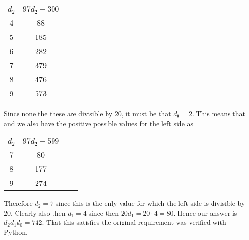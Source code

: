 \documentclass[table]{article}
\begin{document}
{\begin{center}
\begin{tabular}{c|ccc}
      $d_2$ & $97 d_2 - 300$ \\
      \hline
      4 & 88 \\
      5 & 185 \\
      6 & 282 \\
      7 & 379 \\
      8 & 476 \\
      9 & 573 \\
    \end{tabular}
  \end{center}
  Since none the these are divisible by $20$, it must be that $d_0 = 2$.
  This means that
  and we also have the positive possible values for the left side as
  \begin{center}
    \begin{tabular}{c|ccc}
      $d_2$ & $97 d_2 - 599$ \\
      \hline
      7 & 80 \\
      8 & 177 \\
      9 & 274 \\
    \end{tabular}
  \end{center}
  Therefore $d_2 = 7$ since this is the only value for which the left side is divisible by $20$.
  Clearly also then $d_1 = 4$ since then $20 d_1 = 20 \cdot 4 = 80$.
  Hence our answer is $d_2 d_1 d_0 = 742$.
  That this satisfies the original requirement was verified with Python.
}



\end{document}

